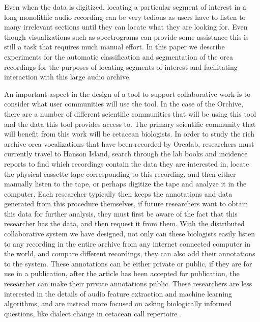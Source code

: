 \documentclass[12pt,oneside]{book}
\begin{document}
Even when the data is digitized, locating a particular segment of
interest in a long monolithic audio recording can be very tedious as
users have to listen to many irrelevant sections until they can locate
what they are looking for. Even though visualizations such as
spectrograms can provide some assistance this is still a task that
requires much manual effort. In this paper we describe experiments for
the automatic classification and segmentation of the orca recordings
for the purposes of locating segments of interest and facilitating
interaction with this large audio archive.

An important aspect in the design of a tool to support collaborative
work is to consider what user communities will use the tool.  In the
case of the Orchive, there are a number of different scientific
communities that will be using this tool and the data this tool
provides access to.  The primary scientific community that will
benefit from this work will be cetacean biologists.  In order to study
the rich archive orca vocalizations that have been recorded by
Orcalab, researchers must currently travel to Hanson Island, search
through the lab books and incidence reports to find which recordings
contain the data they are interested in, locate the physical cassette
tape corresponding to this recording, and then either manually listen
to the tape, or perhaps digitize the tape and analyze it in the
computer.  Each researcher typically then keeps the annotations and
data generated from this procedure themselves, if future researchers
want to obtain this data for further analysis, they must first be
aware of the fact that this researcher has the data, and then request
it from them.  With the distributed collaborative system we have
designed, not only can these biologists easily listen to any recording
in the entire archive from any internet connected computer in the
world, and compare different recordings, they can also add their
annotations to the system.  These annotations can be either private or
public, if they are for use in a publication, after the article has
been accepted for publication, the researcher can make their private
annotations public.  These researchers are less interested in the
details of audio feature extraction and machine learning algorithms,
and are instead more focused on asking biologically informed
questions, like dialect change in cetacean call repertoire
\cite{deecke00}.
\end{document}
